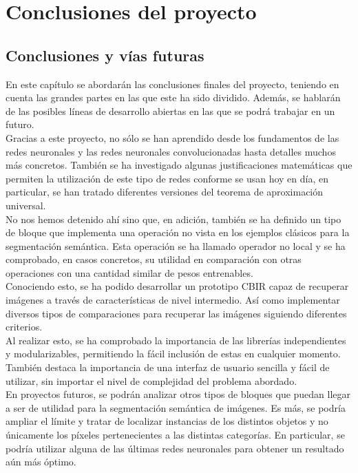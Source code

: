\part{Conclusiones del proyecto}
\chapter{Conclusiones y vías futuras}

En este capítulo se abordarán las conclusiones finales del proyecto, teniendo en cuenta las grandes partes en las que este ha sido dividido. Además, se hablarán de las posibles líneas de desarrollo abiertas en las que se podrá trabajar en un futuro.\\

Gracias a este proyecto, no sólo se han aprendido desde los fundamentos de las redes neuronales y las redes neuronales convolucionadas hasta detalles muchos más concretos. También se ha investigado algunas justificaciones matemáticas que permiten la utilización de este tipo de redes conforme se usan hoy en día, en particular, se han tratado diferentes versiones del teorema de aproximación universal.\\

No nos hemos detenido ahí sino que, en adición, también se ha definido un tipo de bloque que implementa una operación no vista en los ejemplos clásicos para la segmentación semántica. Esta operación se ha llamado operador no local y se ha comprobado, en casos concretos, su utilidad en comparación con otras operaciones con una cantidad similar de pesos entrenables.\\

Conociendo esto, se ha podido desarrollar un prototipo CBIR capaz de recuperar imágenes a través de características de nivel intermedio. Así como implementar diversos tipos de comparaciones para recuperar las imágenes siguiendo diferentes criterios.\\

Al realizar esto, se ha comprobado la importancia de las librerías independientes y modularizables, permitiendo la fácil inclusión de estas en cualquier momento. También destaca la importancia de una interfaz de usuario sencilla y fácil de utilizar, sin importar el nivel de complejidad del problema abordado.\\

En proyectos futuros, se podrán analizar otros tipos de bloques que puedan llegar a ser de utilidad para la segmentación semántica de imágenes. Es más, se podría ampliar el límite y tratar de localizar instancias de los distintos objetos y no únicamente los píxeles pertenecientes a las distintas categorías. En particular, se podría utilizar alguna de las últimas redes neuronales para obtener un resultado aún más óptimo.\\

